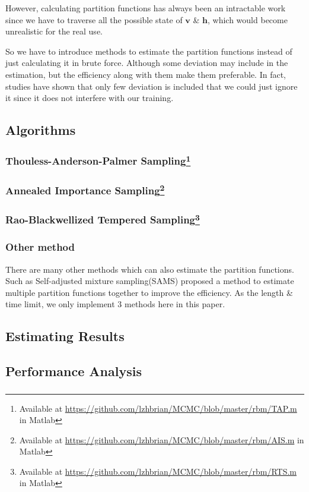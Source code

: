However, calculating partition functions has always been an intractable work since we have to traverse all the possible state of $\mathbf v$ \& $\mathbf h$, which would become unrealistic for the real use.

So we have to introduce methods to estimate the partition functions instead of just calculating it in brute force. Although some deviation may include in the estimation, but the efficiency along with them make them preferable. In fact, studies have shown that only few deviation is included that we could just ignore it since it does not interfere with our training.


\subsection{Algorithms}

\subsubsection{Thouless-Anderson-Palmer Sampling\protect\footnote{Available at \protect\url{https://github.com/lzhbrian/MCMC/blob/master/rbm/TAP.m} in Matlab}}
\subsubsection{Annealed Importance Sampling\protect\footnote{Available at \protect\url{https://github.com/lzhbrian/MCMC/blob/master/rbm/AIS.m} in Matlab}}
\subsubsection{Rao-Blackwellized Tempered Sampling\protect\footnote{Available at \protect\url{https://github.com/lzhbrian/MCMC/blob/master/rbm/RTS.m} in Matlab}}



\subsubsection{Other method}
There are many other methods which can also estimate the partition functions. Such as Self-adjusted mixture sampling(SAMS)\cite{tan2015optimally} proposed a method to estimate multiple partition functions together to improve the efficiency. As the length \& time limit, we only implement 3 methods here in this paper.


\subsection{Estimating Results}



\subsection{Performance Analysis}
\subsubsection{}


